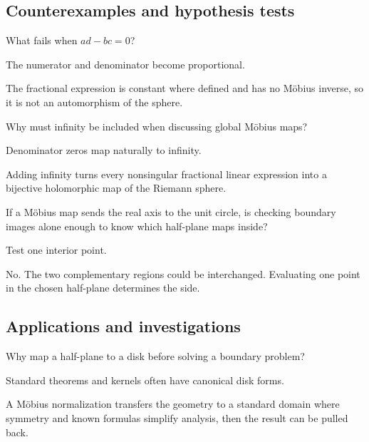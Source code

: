 \subsection*{Counterexamples and hypothesis tests}

\begin{exercise}\label{exr:iv16-expand-10}
What fails when \(ad-bc=0\)?
\end{exercise}
\begin{hint}
The numerator and denominator become proportional.
\end{hint}
\begin{solution}
The fractional expression is constant where defined and has no Möbius inverse, so it is not an automorphism of the sphere.
\end{solution}

\begin{exercise}\label{exr:iv16-expand-11}
Why must infinity be included when discussing global Möbius maps?
\end{exercise}
\begin{hint}
Denominator zeros map naturally to infinity.
\end{hint}
\begin{solution}
Adding infinity turns every nonsingular fractional linear expression into a bijective holomorphic map of the Riemann sphere.
\end{solution}

\begin{exercise}\label{exr:iv16-expand-12}
If a Möbius map sends the real axis to the unit circle, is checking boundary images alone enough to know which half-plane maps inside?
\end{exercise}
\begin{hint}
Test one interior point.
\end{hint}
\begin{solution}
No. The two complementary regions could be interchanged. Evaluating one point in the chosen half-plane determines the side.
\end{solution}

\subsection*{Applications and investigations}

\begin{exercise}\label{exr:iv16-expand-13}
Why map a half-plane to a disk before solving a boundary problem?
\end{exercise}
\begin{hint}
Standard theorems and kernels often have canonical disk forms.
\end{hint}
\begin{solution}
A Möbius normalization transfers the geometry to a standard domain where symmetry and known formulas simplify analysis, then the result can be pulled back.
\end{solution}

